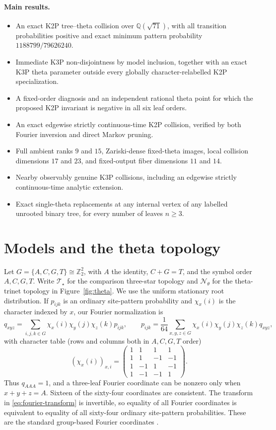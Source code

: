\documentclass[11pt]{article}
\theoremstyle{remark}\newtheorem{remark}[theorem]{Remark}
\newcommand{\Tstar}{\mathcal T_\star}\newcommand{\Ntheta}{\mathcal N_\theta}
\begin{document}
\paragraph{Main results.}
\begin{itemize}
\item An exact K2P tree--theta collision over $\mathbb Q(\sqrt{71})$, with all transition probabilities positive and exact minimum pattern probability $1188799/79626240$.
\item Immediate K3P non-disjointness by model inclusion, together with an exact K3P theta parameter outside every globally character-relabelled K2P specialization.
\item A fixed-order diagnosis and an independent rational theta point for which the proposed K2P invariant is negative in all six leaf orders.
\item An exact edgewise strictly continuous-time K2P collision, verified by both Fourier inversion and direct Markov pruning.
\item Full ambient ranks $9$ and $15$, Zariski-dense fixed-theta images, local collision dimensions $17$ and $23$, and fixed-output fiber dimensions $11$ and $14$.
\item Nearby observably genuine K3P collisions, including an edgewise strictly continuous-time analytic extension.
\item Exact single-theta replacements at any internal vertex of any labelled unrooted binary tree, for every number of leaves $n\ge3$.
\end{itemize}

\section{Models and the theta topology}\label{sec:models}
Let $G=\{A,C,G,T\}\cong\mathbb Z_2^2$, with $A$ the identity, $C+G=T$, and the symbol order $A,C,G,T$. Write $\Tstar$ for the comparison three-star topology and $\Ntheta$ for the theta-trinet topology in Figure~\ref{fig:theta}. We use the uniform stationary root distribution. If $p_{ijk}$ is an ordinary site-pattern probability and $\chi_x(i)$ is the character indexed by $x$, our Fourier normalization is
\begin{equation}\label{eq:fourier-transform}
q_{xyz}=\sum_{i,j,k\in G}\chi_x(i)\chi_y(j)\chi_z(k)p_{ijk},\qquad
p_{ijk}=\frac1{64}\sum_{x,y,z\in G}\chi_x(i)\chi_y(j)\chi_z(k)q_{xyz},
\end{equation}
with character table (rows and columns both in $A,C,G,T$ order)
\[
(\chi_x(i))_{x,i}=\begin{pmatrix}
1&1&1&1\\ 1&1&-1&-1\\ 1&-1&1&-1\\ 1&-1&-1&1
\end{pmatrix}.
\]
Thus $q_{AAA}=1$, and a three-leaf Fourier coordinate can be nonzero only when $x+y+z=A$. Sixteen of the sixty-four coordinates are consistent. The transform in \eqref{eq:fourier-transform} is invertible, so equality of all Fourier coordinates is equivalent to equality of all sixty-four ordinary site-pattern probabilities. These are the standard group-based Fourier coordinates \cite{EvansSpeed1993,SturmfelsSullivant2005}.
\end{document}
